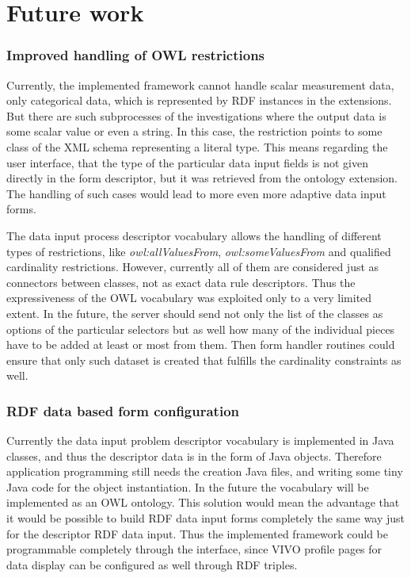 \section{Future work}

\subsubsection{Improved handling of OWL restrictions}

Currently, the implemented framework cannot handle scalar measurement data, only categorical data, which is represented by RDF instances in the extensions. But there are such subprocesses of the investigations where the output data is some scalar value or even a string. In this case, the restriction points to some class of the XML schema representing a literal type. This means regarding the user interface, that the type of the particular data input fields is not given directly in the form descriptor, but it was retrieved from the ontology extension. The handling of such cases would lead to more even more adaptive data input forms.

The data input process descriptor vocabulary allows the handling of different types of restrictions, like \textit{owl:allValuesFrom}, \textit{owl:someValuesFrom} and qualified cardinality restrictions. However, currently all of them are considered just as connectors between classes, not as exact data rule descriptors. Thus the expressiveness of the OWL vocabulary was exploited only to a very limited extent. In the future, the server should send not only the list of the classes as options of the particular selectors but as well how many of the individual pieces have to be added at least or most from them. Then form handler routines could ensure that only such dataset is created that fulfills the cardinality constraints as well.

\subsubsection{RDF data based form configuration}

Currently the data input problem descriptor vocabulary is implemented in Java classes, and thus the descriptor data is in the form of Java objects. Therefore application programming still needs the creation Java files, and writing some tiny Java code for the object instantiation. In the future the vocabulary will be implemented as an OWL ontology. This solution would mean the advantage that it would be possible to build RDF data input forms completely the same way just for the descriptor RDF data input. Thus the implemented framework could be programmable completely through the interface, since VIVO profile pages for data display can be configured as well through RDF triples.

